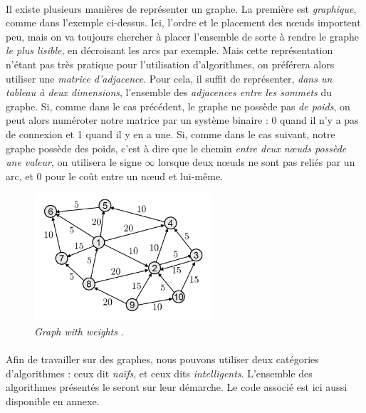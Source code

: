 \paragraph{} Il existe plusieurs manières de représenter un graphe. La première est \emph{graphique}, comme dans 
l'exemple ci-dessus. Ici, l'ordre et le placement des n\oe{}uds importent peu, mais on va toujours chercher à placer
l'ensemble de sorte à rendre le graphe \emph{le plus lisible}, en décroisant les arcs par exemple. Mais cette représentation
n'étant pas très pratique pour l'utilisation d'algorithmes, on préférera alors utiliser une \emph{matrice d'adjacence}.
Pour cela, il suffit de représenter, \emph{dans un tableau à deux dimensions}, l'ensemble des \emph{adjacences entre les
sommets} du graphe. Si, comme dans le cas précédent, le graphe ne possède pas \emph{de poids}, on peut alors numéroter
notre matrice par un système binaire : 0 quand il n'y a pas de connexion et 1 quand il y en a une. Si, comme dans le cas
suivant, notre graphe possède des poids, c'est à dire que le chemin \emph{entre deux n\oe{}uds possède une valeur}, on
utilisera le signe $\infty$ lorsque deux n\oe{}uds ne sont pas reliés par un arc, et 0 pour le coût entre un n\oe{}ud et
lui-même.

\begin{figure}[ht]
    \centering
    \includegraphics[width=250px]{chapters/03/images/weighted_graph.png}
    \caption{\label{weighted_graph}\emph{Graph with weights} \cite{GraphTheory1}.}
\end{figure}

\paragraph{} Afin de travailler sur des graphes, nous pouvons utiliser deux catégories d'algorithmes : ceux dit \emph{naïfs},
et ceux dits \emph{intelligents}. L'ensemble des algorithmes présentés le seront sur leur démarche. Le code associé est
ici aussi disponible en annexe.


